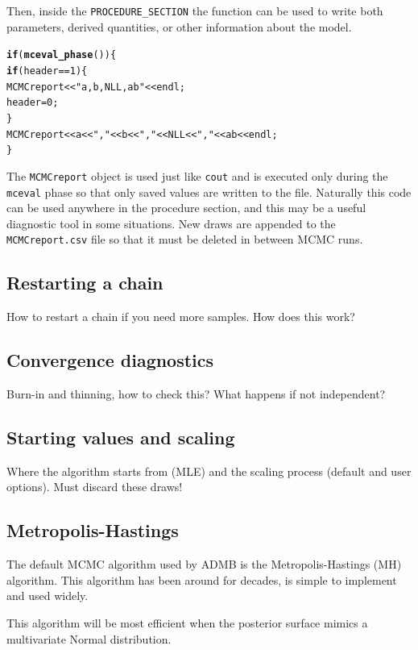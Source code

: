 \documentclass{article}\usepackage[]{graphicx}\usepackage[]{color}
\makeatletter
\newcommand{\hlstr}[1]{\textcolor[rgb]{0.192,0.494,0.8}{#1}}%
\newcommand{\hlkwd}[1]{\textcolor[rgb]{0.737,0.353,0.396}{\textbf{#1}}}%
\newenvironment{kframe}{%
 \def\at@end@of@kframe{}%
 \ifinner\ifhmode%
  \def\at@end@of@kframe{\end{minipage}}%
  \begin{minipage}{\columnwidth}%
 \fi\fi%
 \def\FrameCommand##1{\hskip\@totalleftmargin \hskip-\fboxsep
 \colorbox{shadecolor}{##1}\hskip-\fboxsep
     \hskip-\linewidth \hskip-\@totalleftmargin \hskip\columnwidth}%
 \MakeFramed {\advance\hsize-\width
   \@totalleftmargin\z@ \linewidth\hsize
   \@setminipage}}%
 {\par\unskip\endMakeFramed%
 \at@end@of@kframe}
\newenvironment{knitrout}{}{} %
\makeatother
\begin{document}
Then, inside the \texttt{PROCEDURE\_SECTION} the function
can be used to write both parameters, derived quantities, or
other information about the model.
\begin{knitrout}
\color{fgcolor}\begin{kframe}
\begin{alltt}
  \hlkwd{if}(\hlkwd{mceval_phase}())\{
    \hlkwd{if}(header==1) \{
        MCMCreport << \hlstr{"a,b,NLL,ab"} << endl;
        header=0;
    \}
   MCMCreport << a <<\hlstr{","} << b << \hlstr{","} << NLL << \hlstr{","} << ab << endl;
  \}
\end{alltt}
\end{kframe}
\end{knitrout}

The \texttt{MCMCreport} object is used just like
\texttt{cout} and is executed only during the
\texttt{mceval} phase so that only saved values are written
to the file. Naturally this code can be used anywhere in the
procedure section, and this may be a useful diagnostic tool
in some situations. New draws are appended to the
\texttt{MCMCreport.csv} file so that it must be deleted in
between MCMC runs.

\subsection{Restarting a chain}\label{sec:restart}
How to restart a chain if you need more samples. How does this work?
\subsection{Convergence diagnostics} \label{sec:diag}
Burn-in and thinning, how to check this? What happens if not
independent? 
\subsection{Starting values and scaling}\label{sec:startvals}
Where the algorithm starts from (MLE) and the scaling process
(default and user options). Must discard these draws!
\subsection{Metropolis-Hastings}\label{sec:MH}
The default MCMC algorithm used by ADMB is the
Metropolis-Hastings (MH) algorithm. This algorithm has been
around for decades, is simple to implement and used widely.

This algorithm will be most efficient when the posterior
surface mimics a multivariate Normal distribution.
\end{document}
